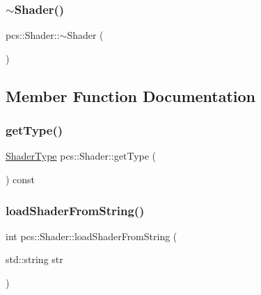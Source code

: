 \mbox{\label{classpcs_1_1Shader_ae29be85176bf296e0b59da4e88f52ba4}} 
\subsubsection{\texorpdfstring{$\sim$\+Shader()}{~Shader()}}
{\footnotesize\ttfamily pcs\+::\+Shader\+::$\sim$\+Shader (\begin{DoxyParamCaption}{ }\end{DoxyParamCaption})}



\subsection{Member Function Documentation}
\mbox{\label{classpcs_1_1Shader_ab2846a8669b4fa1904c921fa1d4bf083}} 
\subsubsection{\texorpdfstring{get\+Type()}{getType()}}
{\footnotesize\ttfamily \hyperlink{namespacepcs_a2f6dfe5fadf3611302a9b7259502c3c9}{Shader\+Type} pcs\+::\+Shader\+::get\+Type (\begin{DoxyParamCaption}{ }\end{DoxyParamCaption}) const\hspace{0.3cm}{\ttfamily [inline]}}

\mbox{\label{classpcs_1_1Shader_ae672370f28f362074596bb9d410738cd}} 
\subsubsection{\texorpdfstring{load\+Shader\+From\+String()}{loadShaderFromString()}}
{\footnotesize\ttfamily int pcs\+::\+Shader\+::load\+Shader\+From\+String (\begin{DoxyParamCaption}\item[{std\+::string}]{str }\end{DoxyParamCaption})}



